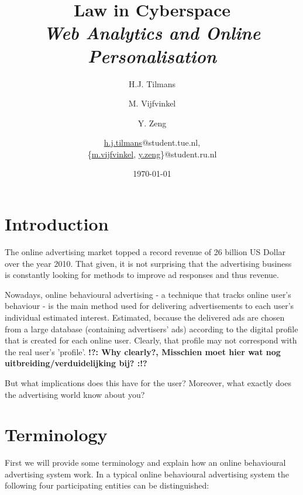 \documentclass[11pt]{article}
\title{\textbf{Law in Cyberspace\\ \emph{Web Analytics and Online Personalisation}}}
\author{
	H.J. Tilmans
	\and M. Vijfvinkel
	\and Y. Zeng
	\and
	\href{mailto:h.j.tilmans@student.tue.nl}{h.j.tilmans}@student.tue.nl,\\
	\{\href{mailto:m.vijfvinkel@student.ru.nl}{m.vijfvinkel},
	\href{mailto:y.zeg@student.ru.nl}{y.zeng}\}@student.ru.nl
}
\date{\today}
\newcommand{\tocheck}[1]{{\bf !?: #1 :!?}}
\newcommand{\oba}{online behavioural advertising }
\begin{document}
\maketitle


\section{Introduction}
The online advertising market topped a record revenue of 26 billion US Dollar over the year 2010. \cite{IAB2011}
That given, it is not surprising that the advertising business is constantly looking for methods to improve ad responses and thus revenue.

Nowadays, \oba - a technique that tracks online user's behaviour - is the main method used for delivering advertisements to each user's individual estimated interest. Estimated, because the delivered ads are chosen from a large database (containing advertisers' ads) according to the digital profile that is created for each online user. Clearly, that profile may not correspond with the real user's 'profile'. \tocheck{Why clearly?, Misschien moet hier wat nog uitbreiding/verduidelijking bij?}

But what implications does this have for the user? Moreover, what exactly does the advertising world know about you?

\section{Terminology}
\label{terminology}
First we will provide some terminology and explain how an \oba system work.
In a typical \oba system the following four participating entities can be distinguished:
\end{document}
